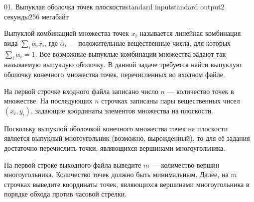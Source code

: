 \begin{problem}{01. Выпуклая оболочка точек плоскости}{standard input}{standard output}{2 секунды}{256 мегабайт}

Выпуклой комбинацией множества точек $x_i$ называется линейная комбинация вида $\sum_i \alpha_i x_i$, где $\alpha_i$ — положительные вещественные числа, для которых $\sum_i \alpha_i = 1$. Все возможные выпуклые комбинации множества задают так называемую выпуклую оболочку. В данной задаче требуется найти выпуклую оболочку конечного множества точек, перечисленных во входном файле.

\InputFile

На первой строчке входного файла записано число $n$ — количество точек в множестве. На последующих $n$ строчках записаны пары вещественных чисел $(x_i, y_i)$, задающие координаты элементов множества на плоскости.

\OutputFile

Поскольку выпуклой оболочкой конечного множества точек на плоскости является выпуклый многоугольник (возможно, вырожденный), то для её задания достаточно перечислить точки, являющихся вершинами многоугольника.

На первой строке выходного файла выведите $m$ — количество вершин многоугольника. Количество точек должно быть минимальным. Далее, на $m$ строчках выведите координаты точек, являющихся вершинами многоугольника в порядке обхода против часовой стрелки. 

\Examples

\begin{example}%
%
\end{example}

\end{problem}
